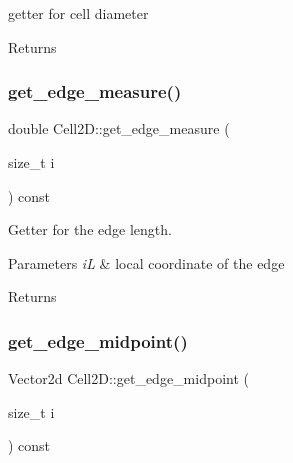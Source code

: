 getter for cell diameter 

\begin{DoxyReturn}{Returns}

\end{DoxyReturn}
\mbox{\label{classMeshFramework2D_1_1Cell2D_ae2f7c7e6c4a58c2851b0ed0735af4035}} 
\subsubsection{\texorpdfstring{get\+\_\+edge\+\_\+measure()}{get\_edge\_measure()}}
{\footnotesize\ttfamily double Cell2\+D\+::get\+\_\+edge\+\_\+measure (\begin{DoxyParamCaption}\item[{size\+\_\+t}]{i }\end{DoxyParamCaption}) const}



Getter for the edge length. 


\begin{DoxyParams}{Parameters}
{\em iL} & local coordinate of the edge\\
\hline
\end{DoxyParams}
\begin{DoxyReturn}{Returns}

\end{DoxyReturn}
\mbox{\label{classMeshFramework2D_1_1Cell2D_a2b3ce883ce985125cc43d7c7509854cc}} 
\subsubsection{\texorpdfstring{get\+\_\+edge\+\_\+midpoint()}{get\_edge\_midpoint()}}
{\footnotesize\ttfamily Vector2d Cell2\+D\+::get\+\_\+edge\+\_\+midpoint (\begin{DoxyParamCaption}\item[{size\+\_\+t}]{i }\end{DoxyParamCaption}) const}



